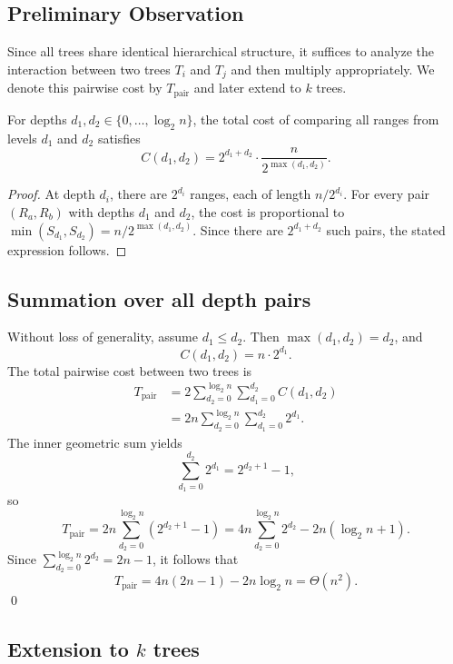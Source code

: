 \documentclass[11pt]{article}
\begin{document}
\subsection{Preliminary Observation}

Since all trees share identical hierarchical structure, it suffices to analyze the interaction between two trees $T_i$ and $T_j$ and then multiply appropriately.  
We denote this pairwise cost by $T_{\mathrm{pair}}$ and later extend to $k$ trees.

\begin{lemma}
For depths $d_1, d_2 \in \{0, \dots, \log_2 n\}$, the total cost of comparing all ranges from levels $d_1$ and $d_2$ satisfies
\[
C(d_1, d_2) = 2^{d_1 + d_2} \cdot \frac{n}{2^{\max(d_1, d_2)}}.
\]
\end{lemma}

\begin{proof}
At depth $d_i$, there are $2^{d_i}$ ranges, each of length $n/2^{d_i}$.  
For every pair $(R_{a}, R_{b})$ with depths $d_1$ and $d_2$, the cost is proportional to $\min(S_{d_1}, S_{d_2}) = n / 2^{\max(d_1, d_2)}$.  
Since there are $2^{d_1 + d_2}$ such pairs, the stated expression follows.
\end{proof}

\subsection{Summation over all depth pairs}

Without loss of generality, assume $d_1 \le d_2$.  
Then $\max(d_1, d_2) = d_2$, and
\[
C(d_1, d_2) = n \cdot 2^{d_1}.
\]
The total pairwise cost between two trees is
\begin{align}
T_{\mathrm{pair}}
  &= 2 \sum_{d_2=0}^{\log_2 n} \sum_{d_1=0}^{d_2} C(d_1, d_2) \\
  &= 2n \sum_{d_2=0}^{\log_2 n} \sum_{d_1=0}^{d_2} 2^{d_1}.
\end{align}
The inner geometric sum yields
\[
\sum_{d_1=0}^{d_2} 2^{d_1} = 2^{d_2 + 1} - 1,
\]
so
\[
T_{\mathrm{pair}}
  = 2n \sum_{d_2=0}^{\log_2 n} (2^{d_2 + 1} - 1)
  = 4n \sum_{d_2=0}^{\log_2 n} 2^{d_2} - 2n (\log_2 n + 1).
\]
Since $\sum_{d_2=0}^{\log_2 n} 2^{d_2} = 2n - 1$, it follows that
\[
T_{\mathrm{pair}} = 4n (2n - 1) - 2n \log_2 n = \Theta(n^2).
\]
\qed

\subsection{Extension to $k$ trees}
\end{document}
